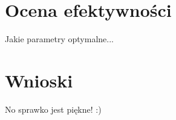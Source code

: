 \documentclass[10pt,a4paper]{article}
\begin{document}
\newpage
\section{Ocena efektywności}
Jakie parametry optymalne...

\section{Wnioski}
No sprawko jest piękne! :)
\end{document}
